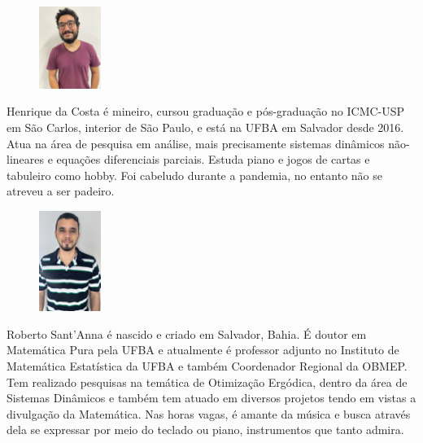 \documentclass{hipatia}
\begin{document}
\vspace{1cm}
\begin{figure}
	\vspace{-10pt}
	\includegraphics[width=2cm]{Henrique.jpg}
\end{figure}\noindent  
  Henrique da Costa é mineiro, cursou graduação e pós-graduação 
  no ICMC-USP em São Carlos, interior de São Paulo, e está na UFBA em Salvador 
  desde 2016. Atua na área de pesquisa em análise, mais precisamente sistemas 
  dinâmicos não-lineares e equações diferenciais parciais. 
  Estuda piano e jogos de cartas e tabuleiro como hobby. 
  Foi cabeludo durante a pandemia, no entanto não se atreveu a ser padeiro.

\vspace{1cm}
\begin{figure}
	\vspace{-10pt}
	\includegraphics[width=2cm]{Roberto.JPG}
\end{figure}\noindent
  Roberto Sant'Anna é nascido e criado em Salvador, Bahia. É doutor em 
  Matemática Pura pela UFBA e atualmente é professor adjunto no Instituto 
  de Matemática Estatística da UFBA e também Coordenador Regional da OBMEP. 
  Tem realizado pesquisas na temática de Otimização Ergódica, dentro da área 
  de Sistemas Dinâmicos e também tem atuado em diversos projetos tendo em 
  vistas a divulgação da Matemática. Nas horas vagas, é amante da música e 
  busca através dela se expressar por meio do teclado ou piano, 
  instrumentos que tanto admira.









%
\end{document}
